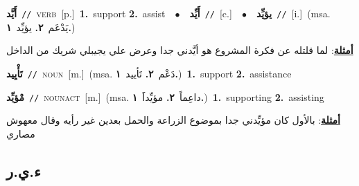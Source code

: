 \documentclass[10pt,a4paper,twoside]{article} %
\begin{document}
\begin{multicols}{2}
{\setlength\topsep{0pt}\textbf{\foreignlanguage{arabic}{أَيَّد}}\ {\color{gray}\texttt{//}\color{black}}\ \textsc{verb}\ [p.]\ \textbf{1.}~support  \textbf{2.}~assist\ \ $\bullet$\ \ \setlength\topsep{0pt}\textbf{\foreignlanguage{arabic}{أَيِّد}}\ {\color{gray}\texttt{//}\color{black}}\ [c.]\ \ $\bullet$\ \ \setlength\topsep{0pt}\textbf{\foreignlanguage{arabic}{يؤيِّد}}\ {\color{gray}\texttt{//}\color{black}}\ [i.]\ \color{gray}(msa. \foreignlanguage{arabic}{يَدْعَم}~\foreignlanguage{arabic}{\textbf{٢.}}  \foreignlanguage{arabic}{يؤيِّد}~\foreignlanguage{arabic}{\textbf{١.}})\color{black}\  \begin{flushright}\color{gray}\foreignlanguage{arabic}{\textbf{\underline{\foreignlanguage{arabic}{أمثلة}}}: لما قلتله عن فكرة المشروع هو أيَّدني جدا وعرض علي يجيبلي شريك من الداخل}\end{flushright}\color{black}} \vspace{2mm}

{\setlength\topsep{0pt}\textbf{\foreignlanguage{arabic}{تَأْيِيد}}\ {\color{gray}\texttt{//}\color{black}}\ \textsc{noun}\ [m.]\ \color{gray}(msa. \foreignlanguage{arabic}{دَعْم}~\foreignlanguage{arabic}{\textbf{٢.}}  \foreignlanguage{arabic}{تَأييد}~\foreignlanguage{arabic}{\textbf{١.}})\color{black}\ \textbf{1.}~support  \textbf{2.}~assistance\ } \vspace{2mm}

{\setlength\topsep{0pt}\textbf{\foreignlanguage{arabic}{مْؤيِّد}}\ {\color{gray}\texttt{//}\color{black}}\ \textsc{noun\textunderscore act}\ [m.]\ \color{gray}(msa. \foreignlanguage{arabic}{داعِماً}~\foreignlanguage{arabic}{\textbf{٢.}}  \foreignlanguage{arabic}{مؤيِّداََ}~\foreignlanguage{arabic}{\textbf{١.}})\color{black}\ \textbf{1.}~supporting  \textbf{2.}~assisting\  \begin{flushright}\color{gray}\foreignlanguage{arabic}{\textbf{\underline{\foreignlanguage{arabic}{أمثلة}}}: بالأول كان مؤيِّدني جدا بموضوع الزراعة والحمل بعدين غير رأيه وقال معهوش مصاري}\end{flushright}\color{black}} \vspace{2mm}

\vspace{-3mm}
\subsection*{\color{blue}\foreignlanguage{arabic}{ء.ي.ر}\color{blue}{ (ntws)}} 


\end{multicols}
\end{document}
